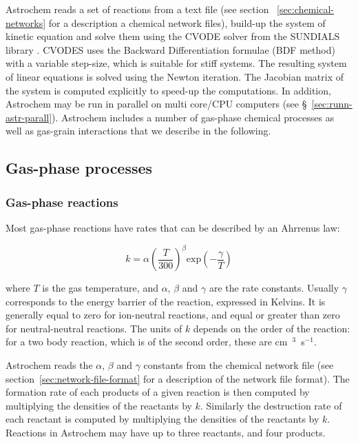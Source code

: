 \documentclass[a4paper,12pt]{article}
\begin{document}
 Astrochem reads a set of reactions from a text file (see section~
 \ref{sec:chemical-networks} for a description a chemical network
 files), build-up the system of kinetic equation and solve them using
 the CVODE solver \citep{Cohen96} from the SUNDIALS library
 \citep{Hindmarsh05}. CVODES uses the Backward Differentiation
 formulae (BDF method) with a variable step-size, which is suitable
 for stiff systems. The resulting system of linear equations is solved
 using the Newton iteration. The Jacobian matrix of the system is
 computed explicitly to speed-up the computations. In addition,
 Astrochem may be run in parallel on multi core/CPU computers (see
 \S~\ref{sec:runn-astr-parall}). Astrochem includes a number of
 gas-phase chemical processes as well as gas-grain interactions that
 we describe in the following.

\subsection{Gas-phase processes}
\label{sec:gas-phase-processes}
 
\subsubsection{Gas-phase reactions}
\label{sec:gas-phase-reactions}

Most gas-phase reactions have rates that can be described by an
Ahrrenus law:

\begin{equation}
  k = \alpha  \left( \frac{T}{300} \right)^\beta  \mathrm{exp} \left(
    -\frac{\gamma}{T} \right)
  \label{eq:arrhenius}
\end{equation}

\noindent
where $T$ is the gas temperature, and $\alpha$, $\beta$ and $\gamma$
are the rate constants. Usually $\gamma$ corresponds to the energy
barrier of the reaction, expressed in Kelvins. It is generally equal
to zero for ion-neutral reactions, and equal or greater than zero for
neutral-neutral reactions. The units of $k$ depends on the order of
the reaction: for a two body reaction, which is of the second order,
these are cm~$^{3}$~s$^{-1}$.

Astrochem reads the $\alpha$, $\beta$ and $\gamma$ constants from the
chemical network file (see section~\ref{sec:network-file-format} for a
description of the network file format). The formation rate of each
products of a given reaction is then computed by multiplying the
densities of the reactants by $k$. Similarly the destruction rate of
each reactant is computed by multiplying the densities of the
reactants by $k$. Reactions in Astrochem may have up to three
reactants, and four products.
\end{document}
